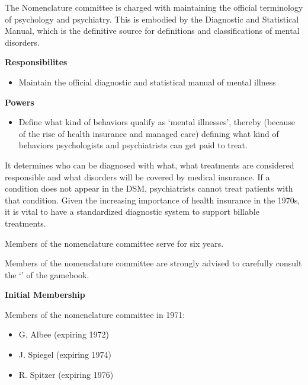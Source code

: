 \begin{refsection}
The Nomenclature committee is charged with maintaining the official terminology of psychology and psychiatry. This is embodied by the Diagnostic and Statistical Manual, which is the definitive source for definitions and classifications of mental disorders. 

\textbf{Responsibilites}

\begin{itemize}
\item Maintain the official diagnostic and statistical manual of mental illness

\end{itemize}

\textbf{Powers}

\begin{itemize}
\item Define what kind of behaviors qualify as `mental illnesses', thereby (because of the rise of health insurance and managed care) defining what kind of behaviors psychologists and psychiatrists can get paid to treat.

\end{itemize}

It determines who can be diagnosed with what, what treatments are considered responsible and what disorders will be covered by medical insurance. If a condition does not appear in the DSM, psychiatrists cannot treat patients with that condition. Given the increasing importance of health insurance in the 1970s, it is vital to have a standardized diagnostic system to support billable treatments.

Members of the nomenclature committee serve for six years.

Members of the nomenclature committee are strongly advised to carefully consult the `' of the gamebook.

\textbf{Initial Membership}

Members of the nomenclature committee in 1971:

\begin{itemize}
\item G. Albee (expiring 1972)

\item J. Spiegel (expiring 1974)

\item R. Spitzer (expiring 1976)

\end{itemize}

\newpage


\end{refsection}
